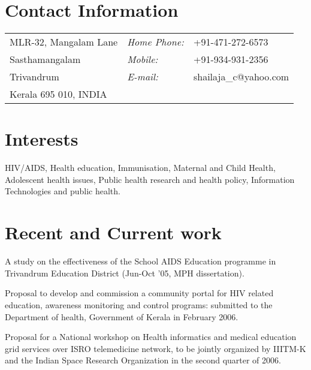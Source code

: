 \documentclass[margin,line]{res}
\newenvironment{list1}{
  \begin{list}{\ding{113}}{%
      \setlength{\itemsep}{0in}
      \setlength{\parsep}{0in} \setlength{\parskip}{0in}
      \setlength{\topsep}{0in} \setlength{\partopsep}{0in} 
      \setlength{\leftmargin}{0.17in}}}{\end{list}}
\begin{document}

\begin{resume}
\section{\sc Contact Information}
\vspace{.05in}
\begin{tabular}{@{}p{2.5in}p{0.9in}l}
MLR-32, Mangalam Lane   & {\it Home Phone:}  & +91-471-272-6573 \\
Sasthamangalam         & {\it Mobile:}      & +91-934-931-2356 \\
Trivandrum             & {\it E-mail:}      & shailaja\_c@yahoo.com\\ 
Kerala 695 010, INDIA  & \\
\end{tabular}

\section{\sc Interests}
HIV/AIDS, Health education, Immunisation, Maternal and Child
Health, Adolescent health issues, Public health research and
health policy, Information Technologies and public health.

\section{\sc Recent and Current work}

A study on the effectiveness of the School AIDS
Education programme in Trivandrum Education District
(Jun-Oct '05, MPH dissertation).

Proposal to develop and commission a community portal
      for HIV related education, awareness monitoring and
      control programs: submitted to the Department of
      health, Government of Kerala in February 2006.

Proposal for a National workshop on Health
      informatics and medical education grid services over
      ISRO telemedicine network, to be jointly organized by
      IIITM-K and the Indian Space Research Organization in
      the second quarter of 2006.


\end{resume}
\end{document}
